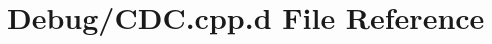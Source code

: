 \hypertarget{_debug_2_c_d_c_8cpp_8d}{\section{\-Debug/\-C\-D\-C.cpp.\-d \-File \-Reference}
\label{_debug_2_c_d_c_8cpp_8d}
}
